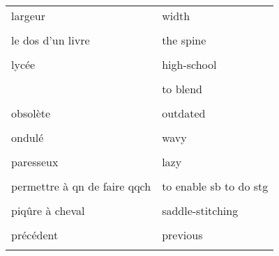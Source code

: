 \documentclass[
  10pt,
]{article}
\begin{document}
\begin{longtable}{ll}
largeur & width\\

\cellcolor{gray!6}{la rogne} & \cellcolor{gray!6}{cut-offs}\\

le dos d'un livre & the spine\\

\cellcolor{gray!6}{longueur} & \cellcolor{gray!6}{length}\\

lycée & high-school\\

\cellcolor{gray!6}{mat} & \cellcolor{gray!6}{matte}\\

 & to blend\\

\cellcolor{gray!6}{\multirow[t]{-2}{*}{\raggedright\arraybackslash mélanger}} & \cellcolor{gray!6}{to mix}\\

obsolète & outdated\\

\cellcolor{gray!6}{ondulé (carton)} & \cellcolor{gray!6}{corrugated}\\

ondulé & wavy\\

\cellcolor{gray!6}{ouvert d'esprit} & \cellcolor{gray!6}{open-minded}\\

paresseux & lazy\\

\cellcolor{gray!6}{pelliculage} & \cellcolor{gray!6}{lamination}\\

permettre à qn de faire qqch & to enable sb to do stg\\

\cellcolor{gray!6}{permettre à quelqu'un de faire qqch} & \cellcolor{gray!6}{to allow sb to do stg}\\

piqûre à cheval & saddle-stitching\\

\cellcolor{gray!6}{ \vphantom{6}& }\\

\multirow[t]{-2}{*}{\raggedright\arraybackslash précédent} & \multirow[t]{-2}{*}{\raggedright\arraybackslash previous}\\

\cellcolor{gray!6}{profondeur} & \cellcolor{gray!6}{depth}\\


\end{longtable}
\end{document}
